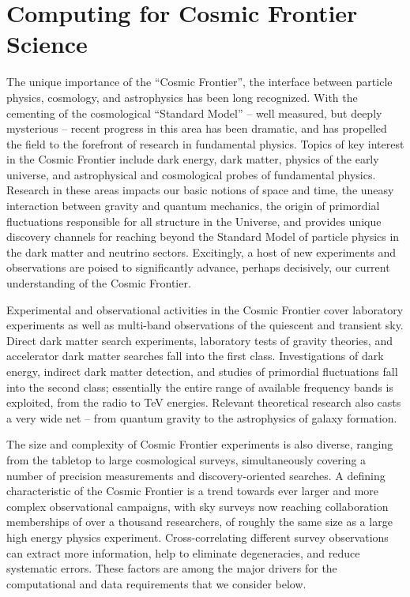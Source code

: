  
\section{Computing for Cosmic Frontier Science}


The unique importance of the ``Cosmic Frontier'', the interface
between particle physics, cosmology, and astrophysics has been long
recognized. With the cementing of the cosmological ``Standard Model''
-- well measured, but deeply mysterious -- recent progress in this
area has been dramatic, and has propelled the field to the forefront
of research in fundamental physics. Topics of key interest in the
Cosmic Frontier include dark energy, dark matter, physics of the early
universe, and astrophysical and cosmological probes of fundamental
physics. Research in these areas impacts our basic notions of space
and time, the uneasy interaction between gravity and quantum
mechanics, the origin of primordial fluctuations responsible for all
structure in the Universe, and provides unique discovery channels for
reaching beyond the Standard Model of particle physics in the dark
matter and neutrino sectors. Excitingly, a host of new experiments and
observations are poised to significantly advance, perhaps decisively,
our current understanding of the Cosmic Frontier.

Experimental and observational activities in the Cosmic Frontier cover
laboratory experiments as well as multi-band observations of the
quiescent and transient sky. Direct dark matter search experiments,
laboratory tests of gravity theories, and accelerator dark matter
searches fall into the first class. Investigations of dark energy,
indirect dark matter detection, and studies of primordial fluctuations
fall into the second class; essentially the entire range of available
frequency bands is exploited, from the radio to TeV energies. Relevant
theoretical research also casts a very wide net -- from quantum
gravity to the astrophysics of galaxy formation.

The size and complexity of Cosmic Frontier experiments is also
diverse, ranging from the tabletop to large cosmological surveys,
simultaneously covering a number of precision measurements and
discovery-oriented searches. A defining characteristic of the Cosmic
Frontier is a trend towards ever larger and more complex observational
campaigns, with sky surveys now reaching collaboration memberships of
over a thousand researchers, of roughly the same size as a large high
energy physics experiment. Cross-correlating different survey
observations can extract more information, help to eliminate
degeneracies, and reduce systematic errors. These factors are among
the major drivers for the computational and data requirements that we
consider below.


